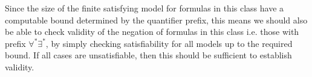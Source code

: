 \documentclass[10pt]{article}
\begin{document}
Since the size of the finite satisfying model for formulas in this class have a computable bound determined by the quantifier prefix, this means we should also be able to check validity of the negation of formulas in this class i.e. those with prefix $\forall^*\exists^*$, by simply checking satisfiability for all models up to the required bound. If all cases are unsatisfiable, then this should be sufficient to establish validity.













\end{document}
